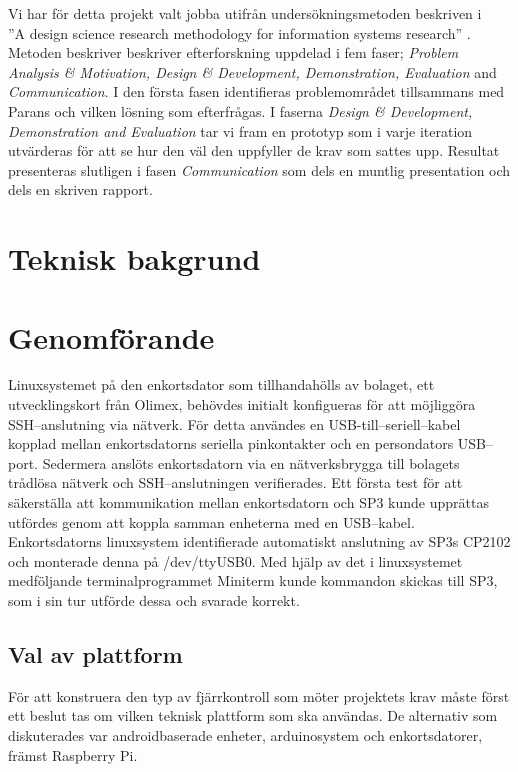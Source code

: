 \documentclass{article}
\begin{document}
        Vi har för detta projekt valt jobba utifrån undersökningsmetoden beskriven i \\
        ''A design science research methodology for information systems research'' \cite{method}. \\

        \noindent Metoden beskriver beskriver efterforskning uppdelad i fem faser;
        \textit{Problem Analysis \& Motivation, Design \& Development, Demonstration, Evaluation} and \textit{Communication}. 
        I den första fasen identifieras problemområdet tillsammans med Parans och vilken lösning som efterfrågas. I faserna \textit{Design \& Development, Demonstration and Evaluation} tar vi fram en prototyp som i varje iteration utvärderas för att se hur den väl den uppfyller de krav som sattes upp.
        Resultat presenteras slutligen i fasen \textit{Communication} som dels en muntlig presentation och dels en skriven rapport.

    \section{Teknisk bakgrund} %
    \label{sec:teknisk_bakgrund}
    


    \section{Genomförande} %
    \label{sec:genomforande}
        Linuxsystemet på den enkortsdator som tillhandahölls av bolaget, ett utvecklingskort från Olimex, behövdes initialt konfigueras för att möjliggöra SSH--\-anslutning via nätverk. För detta användes en USB-till--seriell--kabel kopplad mellan enkortsdatorns seriella pinkontakter och en persondators USB--port. Sedermera anslöts enkortsdatorn via en nätverksbrygga till bolagets trådlösa nätverk och SSH--anslutningen verifierades. Ett första test för att säkerställa att kommunikation mellan enkortsdatorn och SP3 kunde upprättas utfördes genom att koppla samman enheterna med en USB--kabel. Enkortsdatorns linuxsystem identifierade automatiskt anslutning av SP3s CP2102 och monterade denna på /dev/ttyUSB0. Med hjälp av det i linuxsystemet medföljande terminalprogrammet Miniterm kunde kommandon skickas till SP3, som i sin tur utförde dessa och svarade korrekt.

        \subsection{Val av plattform} %
        \label{sub:val_av_plattform}
        För att konstruera den typ av fjärrkontroll som möter projektets krav måste först ett beslut tas om vilken teknisk plattform som ska användas. De alternativ som diskuterades var androidbaserade enheter, arduinosystem och enkortsdatorer, främst Raspberry Pi.\\
\end{document}

